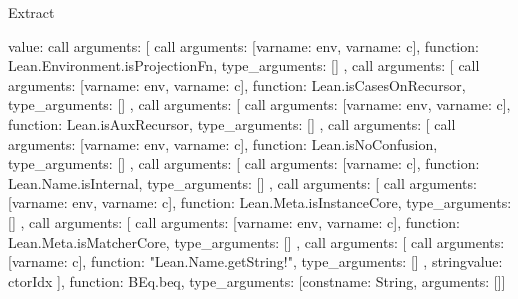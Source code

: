 \begin{lexlean}{Extract}
\begin{toolingmodule}
{{{        value: call{
          arguments: [
            call{
              arguments: [var{name: env}, var{name: c}],
              function: Lean.Environment.isProjectionFn,
              type_arguments: []
            },
            call{
              arguments: [
                call{
                  arguments: [var{name: env}, var{name: c}],
                  function: Lean.isCasesOnRecursor,
                  type_arguments: []
                },
                call{
                  arguments: [
                    call{
                      arguments: [var{name: env}, var{name: c}],
                      function: Lean.isAuxRecursor,
                      type_arguments: []
                    },
                    call{
                      arguments: [
                        call{
                          arguments: [var{name: env}, var{name: c}],
                          function: Lean.isNoConfusion,
                          type_arguments: []
                        },
                        call{
                          arguments: [
                            call{
                              arguments: [var{name: c}],
                              function: Lean.Name.isInternal,
                              type_arguments: []
                            },
                            call{
                              arguments: [
                                call{
                                  arguments: [var{name: env}, var{name: c}],
                                  function: Lean.Meta.isInstanceCore,
                                  type_arguments: []
                                },
                                call{
                                  arguments: [
                                    call{
                                      arguments: [var{name: env}, var{name: c}],
                                      function: Lean.Meta.isMatcherCore,
                                      type_arguments: []
                                    },
                                    call{
                                      arguments: [
                                        call{
                                          arguments: [var{name: c}],
                                          function: "Lean.Name.getString!",
                                          type_arguments: []
                                        },
                                        string{value: ctorIdx}
                                      ],
                                      function: BEq.beq,
                                      type_arguments: [const{name: String, arguments: []}]
}}}}}}}}}}}
\end{toolingmodule}
\end{lexlean}
